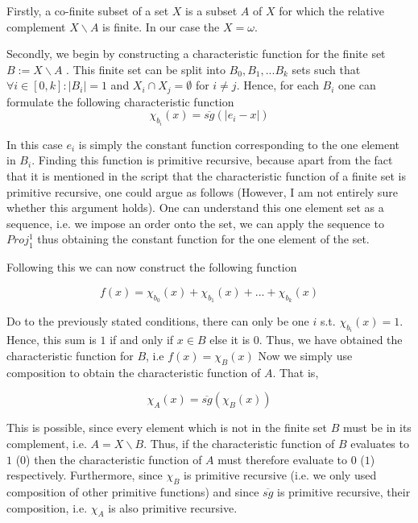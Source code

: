 \documentclass[11pt,a4paper]{article}
\begin{document}
\bigbreak

Firstly, a co-finite subset of a set $X$ is a subset $A$ of $X$ for which the relative complement $X \backslash A$ is finite. 
In our case the  $X=\omega$. 

Secondly, we begin by constructing a characteristic function for the finite set $B:=X \backslash A$ .
This finite set can be split into $B_0, B_1, ... B_k$ sets such that $\forall i \in [0,k]: |B_i|=1$ and $X_i \cap X_j = \emptyset $ for $i \neq j$.
Hence, for each $B_i$ one can formulate the following characteristic function
\begin{equation*}
\chi_{b_i}(x)= \overline{sg}(|e_i-x|)
\end{equation*}

In this case $e_i$ is simply the constant function corresponding to the one element in $B_i$. Finding this function is primitive recursive, because
apart from the fact that it is mentioned in the script that the characteristic function of a finite set is primitive recursive,
one could argue as follows (However, I am not entirely sure whether this argument holds).
One can understand this one element set as a sequence, i.e. we impose an order onto the set, we can apply the sequence to $Proj_1^1$ thus obtaining the 
constant function for the one element of the set. 

Following this we can now construct the following function

\begin{equation*}
f(x)= \chi_{b_0}(x) +  \chi_{b_1}(x) + ... +  \chi_{b_k}(x)
\end{equation*}


Do to the previously stated conditions, there can only be one $i$ s.t. $\chi_{b_i}(x)=1$. Hence, this sum is $1$ if and only if $x \in B$ else it is $0$.
Thus, we have obtained the characteristic function for $B$, i.e $f(x)=\chi_{B}(x)$
Now we simply use composition to obtain the characteristic function of $A$. That is,

\begin{equation*}
\chi_{A}(x) =  \overline{sg}(\chi_{B}(x))
\end{equation*}

This is possible, since every element which is not in the finite set $B$ must be in its complement, i.e. $A=X \backslash B$. 
Thus, if the characteristic function of $B$ evaluates to $1$ ($0$) then the characteristic function of $A$ must therefore evaluate to $0$ ($1$) respectively.
Furthermore, since $\chi_{B}$ is primitive recursive (i.e. we only used composition of other primitive functions) and since $ \overline{sg}$ is primitive recursive,
their composition, i.e.  $\chi_{A}$ is also primitive recursive.
\end{document}
